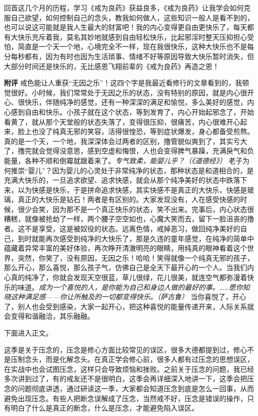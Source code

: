 \begin{case}
    回首这几个月的历程，学习《戒为良药》获益良多，《戒为良药》让我学会如何克服自己欲望，如何控制自己的念头，教我如何做人，这些知识一般人是看不到的，也可以说这可能就是我人生最大的财富吧！我的内心变得更自由更快乐了，每天都有大快乐充斥着我，莫名其妙地就感到自由轻松快乐，比起邪淫时整天压抑担心受怕，简直是一个天一个地，心境完全不一样，现在我很快乐，这种大快乐也不是每分每秒都有，因为有时也因为生活琐事、情绪不好等原因导致大快乐暂时消失，但大部分时间还是快乐的，无比感恩飞翔前辈的《戒为良药》再造之恩！

    \textbf{附评} 戒色能让人重获“无因之乐”！这四个字是我最近看修行的文章看到的，我顿觉很好。小时候，我们常常处于无因之乐的状态，没有特别的原因，就是内心很开心、很快乐，伴随纯净的感觉，还有一种深深的满足和愉悦，多么美好的感觉，内心感到自由和快乐。小孩子就在这个状态，等到发育了，内心开始起邪念了，开始看黄了，就从那个天堂般的状态失落了，变得很压抑，很痛苦，内心很难开心起来，脸上也没了纯真无邪的笑容，活得很惶恐，等到症状爆发，身心都备受煎熬。真的是一个天，一个地，我深深体会过两者的区别，撸管貌似爽到了，其实亏大了，撸完就会觉得没意思，感到空虚和悔恨，人也会变得脾气暴躁，充满戾气和负能量，各种不顺和倒霉就跟着来了。\textit{专气致柔，能婴儿乎？（《道德经》）} 老子为何推崇“婴儿”？因为婴儿的心灵处于非常纯净的状态，那种状态是和道相合的，是充满大快乐的，一旦追求欲望、追求快感，就会从那个纯净美好的状态中跌落下来，以为快感是快乐，于是拼命追求快感，其实快感不是真正的大快乐，快感是玻璃，真正的大快乐是钻石！两者是有区别的。大家发现没有，人在感受快感的时候，很少会笑，因为那不是一个真正快乐的状态，笑不出来。完事后，内心状态很糟糕，就像被抢劫了一样，两个腰子空空如也，心魔大笑而去，留下一脸沮丧的撸者。这不是享受，这是被奴役的状态。远离色情，戒掉恶习，做回纯净美好的自己，到时就能再次感受到纯净的大快乐了，那是久违的童年感觉，在纯净的简单中蕴藏着异常丰富的美好体验，再次睁开清澈明亮的眼睛，用纯真的眼神看着这个世界，突然，你笑了，没有原因，无因之乐！哈哈！笑得就像一个纯真无邪的孩子，那么开心，那么喜悦，那么孩子气，仿佛自己是全天下最开心的一个人。当我们内心真的纯净了，你就会发现天空很蓝，草儿很绿，花儿很美，就连空气都弥漫着快乐的味道。\textit{成为一个喜悦的人，是你能为自己和身边人做的最好的事。……愿你知晓这种满足感——你让所触及的一切都变得快乐。（萨古鲁）} 当你喜悦了，开心了，别人也会受到感染，大家一起开心，把这种喜悦的能量传递开来，人际关系就会变得和谐融洽，其乐融融。
\end{case}

下面进入正文。

这季是关于压念的，压念是修心方面比较常见的误区，很多大德都提到过，修心不是压制念头，而是化解念头。在真正学会修心前，很多人都有过压念的思想误区，在实战中也会试图压念，这样只会导致烦恼和挫败。之前关于压念的问题，我已经多次讲到过了，有的戒友还不是很明白，这季会再详细深入地讲一下，这季会把压念的问题彻底讲透，通过研读这一季，大家都会知道压念到底是怎么一回事，从而避免出现压念。有些人把断念误解成了压念，当然戒不好，压念是错误的操作，只有明白了什么是真正的断念，什么是压念，才能避免陷入误区。

